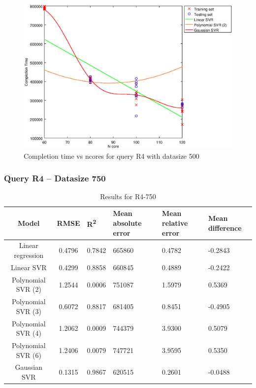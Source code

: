 \documentclass[a4paper,11pt]{article}
\begin{document}
\begin {figure}[hbtp]
\centering
\includegraphics[width=\textwidth]{output/R4_500_ONLY_1_LINEAR_NCORE/plot_R4_500_bestmodels.eps}
\caption{Completion time vs ncores for query R4 with datasize 500}
\label{fig:coreonly_linear_R4_500}
\end {figure}

\newpage
\subsubsection{Query R4 -- Datasize 750}
\begin{table}[H]
	\centering
	\begin{adjustbox}{center}
		\begin{tabular}{c | c M{1.2cm} M{2.5cm} M{2.5cm} M{1.8cm}}
			Model & RMSE & R\textsuperscript{2} & Mean absolute error & Mean relative error & Mean difference \tabularnewline
			\hline
			Linear regression & 0.4796 & 0.7842 & 665860 & 0.4782 & -0.2843 \\
			Linear SVR & 0.4299 & 0.8858 & 660845 & 0.4889 & -0.2422 \\
			Polynomial SVR (2) & 1.2544 & 0.0006 & 751087 & 1.5979 & 0.5369 \\
			Polynomial SVR (3) & 0.6072 & 0.8817 & 681405 & 0.8451 & -0.4905 \\
			Polynomial SVR (4) & 1.2062 & 0.0009 & 744379 & 3.9300 & 0.5079 \\
			Polynomial SVR (6) & 1.2406 & 0.0079 & 747721 & 3.9595 & 0.5350 \\
			Gaussian SVR & 0.1315 & 0.9867 & 620515 & 0.2601 & -0.0488 \\
		\end{tabular}
	\end{adjustbox}
	\\
	\caption{Results for R4-750}
	\label{fig:coreonly_linear_R4_750}
\end{table}
\end{document}
